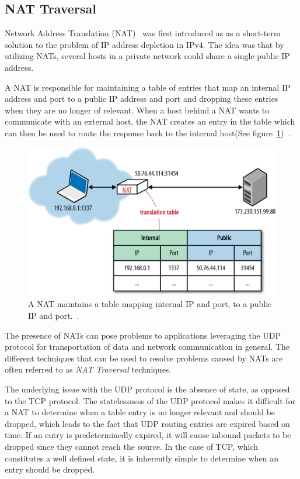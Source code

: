 \subsection{NAT Traversal}
\label{subsec:nattraversal}
Network Address Translation (NAT)~\cite{RFC1631:Online} was first introduced as as a short-term solution to the problem of IP address depletion in IPv4. The idea was that by utilizing NATs, several hosts in a private network could share a single public IP address.

A NAT is responsible for maintaining a table of entries that map an internal IP address and port to a public IP address and port and dropping these entries when they are no longer of relevant. When a host behind a NAT wants to communicate with an external host, the NAT creates an entry in the table which can then be used to route the response back to the internal host(See figure~\ref{fig:NAT})~\cite{RFC5245:Online}.

\begin{figure}[htp]
\centering
\includegraphics[width=\textwidth,height=0.2\paperheight,keepaspectratio
]{figures/nat}
\caption{A NAT maintains a table mapping internal IP and port, to a public IP and port.~\cite{NATIllustration:Online}.}
\label{fig:NAT}
\end{figure}

The presence of NATs can pose problems to applications leveraging the UDP protocol for transportation of data and network communication in general. The different techniques that can be used to resolve problems caused by NATs are often referred to as \emph{NAT Traversal} techniques.

The underlying issue with the UDP protocol is the absence of state, as opposed to the TCP protocol. The statelessness of the UDP protocol makes it difficult for a NAT to determine when a table entry is no longer relevant and should be dropped, which leads to the fact that UDP routing entries are expired based on time. If an entry is predeterminedly expired, it will cause inbound packets to be dropped since they cannot reach the source. In the case of TCP, which constitutes a well defined state, it is inherently simple to determine when an entry should be dropped.

